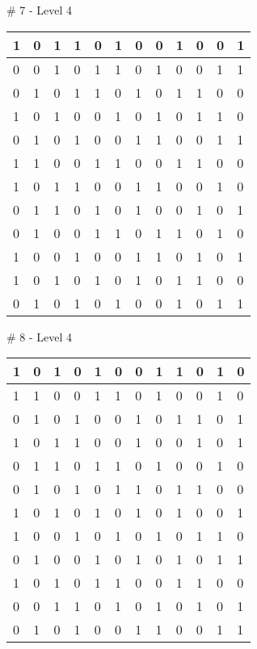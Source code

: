 \# 7 - Level 4 \newline
\begin{tabular}{|m{\collen}|m{\collen}|m{\collen}|m{\collen}|m{\collen}|m{\collen}|m{\collen}|m{\collen}|m{\collen}|m{\collen}|m{\collen}|m{\collen}|}
\hline
  1 & 0 & 1 & 1 & 0 & 1 & 0 & 0 & 1 & 0 & 0 & 1 \\
\hline
  0 & 0 & 1 & 0 & 1 & 1 & 0 & 1 & 0 & 0 & 1 & 1 \\
\hline
  0 & 1 & 0 & 1 & 1 & 0 & 1 & 0 & 1 & 1 & 0 & 0 \\
\hline
  1 & 0 & 1 & 0 & 0 & 1 & 0 & 1 & 0 & 1 & 1 & 0 \\
\hline
  0 & 1 & 0 & 1 & 0 & 0 & 1 & 1 & 0 & 0 & 1 & 1 \\
\hline
  1 & 1 & 0 & 0 & 1 & 1 & 0 & 0 & 1 & 1 & 0 & 0 \\
\hline
  1 & 0 & 1 & 1 & 0 & 0 & 1 & 1 & 0 & 0 & 1 & 0 \\
\hline
  0 & 1 & 1 & 0 & 1 & 0 & 1 & 0 & 0 & 1 & 0 & 1 \\
\hline
  0 & 1 & 0 & 0 & 1 & 1 & 0 & 1 & 1 & 0 & 1 & 0 \\
\hline
  1 & 0 & 0 & 1 & 0 & 0 & 1 & 1 & 0 & 1 & 0 & 1 \\
\hline
  1 & 0 & 1 & 0 & 1 & 0 & 1 & 0 & 1 & 1 & 0 & 0 \\
\hline
  0 & 1 & 0 & 1 & 0 & 1 & 0 & 0 & 1 & 0 & 1 & 1 \\
\hline
\end{tabular}


\smallskip

\# 8 - Level 4 \newline
\begin{tabular}{|m{\collen}|m{\collen}|m{\collen}|m{\collen}|m{\collen}|m{\collen}|m{\collen}|m{\collen}|m{\collen}|m{\collen}|m{\collen}|m{\collen}|}
\hline
  1 & 0 & 1 & 0 & 1 & 0 & 0 & 1 & 1 & 0 & 1 & 0 \\
\hline
  1 & 1 & 0 & 0 & 1 & 1 & 0 & 1 & 0 & 0 & 1 & 0 \\
\hline
  0 & 1 & 0 & 1 & 0 & 0 & 1 & 0 & 1 & 1 & 0 & 1 \\
\hline
  1 & 0 & 1 & 1 & 0 & 0 & 1 & 0 & 0 & 1 & 0 & 1 \\
\hline
  0 & 1 & 1 & 0 & 1 & 1 & 0 & 1 & 0 & 0 & 1 & 0 \\
\hline
  0 & 1 & 0 & 1 & 0 & 1 & 1 & 0 & 1 & 1 & 0 & 0 \\
\hline
  1 & 0 & 1 & 0 & 1 & 0 & 1 & 0 & 1 & 0 & 0 & 1 \\
\hline
  1 & 0 & 0 & 1 & 0 & 1 & 0 & 1 & 0 & 1 & 1 & 0 \\
\hline
  0 & 1 & 0 & 0 & 1 & 0 & 1 & 0 & 1 & 0 & 1 & 1 \\
\hline
  1 & 0 & 1 & 0 & 1 & 1 & 0 & 0 & 1 & 1 & 0 & 0 \\
\hline
  0 & 0 & 1 & 1 & 0 & 1 & 0 & 1 & 0 & 1 & 0 & 1 \\
\hline
  0 & 1 & 0 & 1 & 0 & 0 & 1 & 1 & 0 & 0 & 1 & 1 \\
\hline
\end{tabular}


